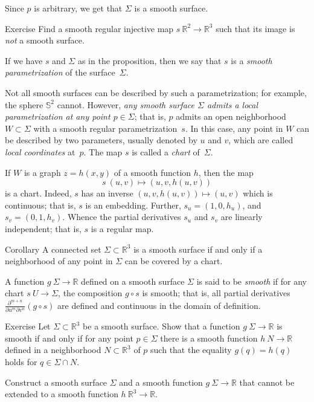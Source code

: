 Since $p$ is arbitrary, we get that $\Sigma$ is a smooth surface.
\qeds

\begin{thm}{Exercise}\label{ex:9-surf}
Find a smooth regular injective map $s\:\mathbb{R}^2\to\mathbb{R}^3$ such that its image is \textit{not} a smooth surface.
\end{thm}

If we have $s$ and $\Sigma$ as in the proposition, then we say that $s$ is a \emph{smooth parametrization} of the surface~$\Sigma$. 

Not all smooth surfaces can be described by such a parametrization;
for example, the sphere $\mathbb{S}^2$ cannot.
However, \textit{any smooth surface $\Sigma$ admits a local parametrization at any point $p\in\Sigma$}; that is,  $p$ admits an open neighborhood $W\subset \Sigma$ with a smooth regular parametrization~$s$.
In this case, any point in $W$ can be described by two parameters, usually denoted by $u$ and $v$, 
which are called \emph{local coordinates} at~$p$.
The map $s$ is called a \emph{chart} of~$\Sigma$.

If $W$ is a graph $z=h(x,y)$ of a smooth function $h$, then the map 
\[s\:(u,v)\mapsto (u,v,h(u,v))\] is a chart.
Indeed, $s$ has an inverse $(u,v,h(u,v))\mapsto (u,v)$ which is continuous;
that is, $s$ is an embedding.
Further,
$s_u=(1,0,h_u)$, and $s_v=(0,1,h_v)$. 
Whence the partial derivatives $s_u$ and $s_v$ are linearly independent;
that is, $s$ is a regular map.

\begin{thm}{Corollary}\label{cor:reg-parmeterization}
A connected set $\Sigma\subset \mathbb{R}^3$ is a smooth surface if and only if a neighborhood of any point in $\Sigma$ can be covered by a chart.
\end{thm}

A function $g\: \Sigma \to \mathbb{R}$ defined on a smooth surface $\Sigma$ is said to be \emph{smooth} if for any chart $s \: U\to \Sigma$,
the composition $g\circ s$ is smooth; that is, all partial derivatives $\frac{\partial^{m+n}}{\partial u^m\partial v^n}(g\circ s)$ are defined and continuous in the domain of definition.

\begin{thm}{Exercise}\label{ex:smooth-fun(surf)}
Let $\Sigma\subset \mathbb{R}^3$ be a smooth surface.
Show that a function $g\:\Sigma\to\mathbb{R}$ is smooth if and only if for any point $p\in \Sigma$ there is a smooth function $h\:N\to\mathbb{R}$ defined in a neighborhood $N\subset \mathbb{R}^3$ of $p$ such that the equality $g(q)=h(q)$ holds for $q\in \Sigma\cap N$.

Construct a smooth surface $\Sigma$ and a smooth function $g\:\Sigma\to\mathbb{R}$ that cannot be extended to a smooth function $h\:\mathbb{R}^3\to\mathbb{R}$.
\end{thm}


